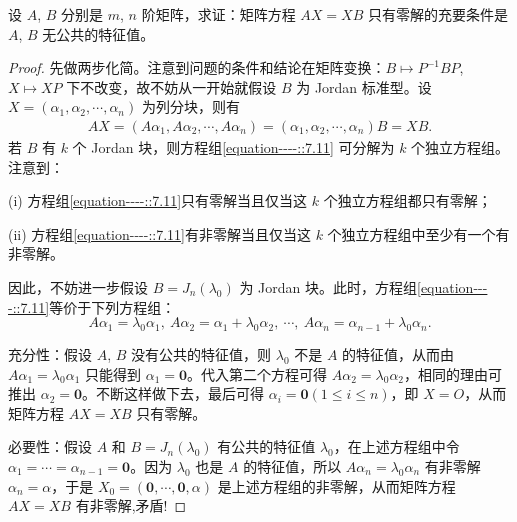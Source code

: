 \documentclass[../../main.tex]{subfiles}
\begin{document}
\begin{proposition}\label{proposition:AX-XB线性映射相关等价条件--(1)}
设 $A$, $B$ 分别是 $m$, $n$ 阶矩阵，求证：矩阵方程 $AX = XB$ 只有零解的充要条件是 $A$, $B$ 无公共的特征值。
\end{proposition}
\begin{proof}
先做两步化简。注意到问题的条件和结论在矩阵变换：$B \mapsto P^{-1}BP$, $X \mapsto XP$ 下不改变，故不妨从一开始就假设 $B$ 为 Jordan 标准型。设 $X = (\alpha_1, \alpha_2, \cdots, \alpha_n)$ 为列分块，则有
\begin{align}
AX = (A\alpha_1, A\alpha_2, \cdots, A\alpha_n) = (\alpha_1, \alpha_2, \cdots, \alpha_n)B = XB. \label{equation----::7.11}
\end{align}
若 $B$ 有 $k$ 个 Jordan 块，则方程组\eqref{equation----::7.11} 可分解为 $k$ 个独立方程组。注意到：

(i) 方程组\eqref{equation----::7.11}只有零解当且仅当这 $k$ 个独立方程组都只有零解；

(ii) 方程组\eqref{equation----::7.11}有非零解当且仅当这 $k$ 个独立方程组中至少有一个有非零解。

因此，不妨进一步假设 $B = J_n(\lambda_0)$ 为 Jordan 块。此时，方程组\eqref{equation----::7.11}等价于下列方程组：
\[
A\alpha_1 = \lambda_0\alpha_1,~ A\alpha_2 = \alpha_1 + \lambda_0\alpha_2,~ \cdots,~ A\alpha_n = \alpha_{n - 1} + \lambda_0\alpha_n.
\]

{\heiti 充分性：}假设 $A$, $B$ 没有公共的特征值，则 $\lambda_0$ 不是 $A$ 的特征值，从而由 $A\alpha_1 = \lambda_0\alpha_1$ 只能得到 $\alpha_1 = \mathbf{0}$。代入第二个方程可得 $A\alpha_2 = \lambda_0\alpha_2$，相同的理由可推出 $\alpha_2 = \mathbf{0}$。不断这样做下去，最后可得 $\alpha_i = \mathbf{0} (1 \leq i \leq n)$，即 $X = O$，从而矩阵方程 $AX = XB$ 只有零解。

{\heiti 必要性：}假设 $A$ 和 $B = J_n(\lambda_0)$ 有公共的特征值 $\lambda_0$，在上述方程组中令 $\alpha_1 = \cdots = \alpha_{n - 1} = \mathbf{0}$。因为 $\lambda_0$ 也是 $A$ 的特征值，所以 $A\alpha_n = \lambda_0\alpha_n$ 有非零解 $\alpha_n = \alpha$，于是 $X_0 = (\mathbf{0}, \cdots, \mathbf{0}, \alpha)$ 是上述方程组的非零解，从而矩阵方程 $AX = XB$ 有非零解,矛盾!
\end{proof}
\end{document}
